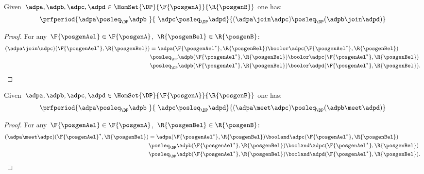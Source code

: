 \begin{lemma}
    \label{lem:coprod_mon}
    Given~$\adpa,\adpb,\adpc,\adpd \in \HomSet{\DP}{\F{\posgenA}}{\R{\posgenB}}$ one has:
    \begin{equation*}
        \prfperiod{\adpa\posleq_\DP \adpb\ }{\ \adpc\posleq_\DP\adpd}{(\adpa\join\adpc)\posleq_\DP (\adpb\join \adpd)}
    \end{equation*}
\end{lemma}
\begin{proof}
    For any~$\F{\posgenAel}\in \F{\posgenA}$,~$\R{\posgenBel}\in \R{\posgenB}$:
    \begin{equation*}
        \begin{aligned}
            (\adpa \join \adpc)(\F{\posgenAel^*},\R{\posgenBel})
             & =\adpa(\F{\posgenAel^*},\R{\posgenBel})\boolor \adpc(\F{\posgenAel^*},\R{\posgenBel})             \\
             & \posleq_\DP \adpb(\F{\posgenAel^*},\R{\posgenBel})\boolor \adpc(\F{\posgenAel^*},\R{\posgenBel})  \\
             & \posleq_\DP \adpb(\F{\posgenAel^*},\R{\posgenBel})\boolor \adpd(\F{\posgenAel^*},\R{\posgenBel}).
        \end{aligned}
    \end{equation*}
\end{proof}

\begin{lemma}
    \label{lem:intersection_mon}
    Given~$\adpa,\adpb,\adpc,\adpd \in \HomSet{\DP}{\F{\posgenA}}{\R{\posgenB}}$ one has:
    \begin{equation*}
        \prfperiod{\adpa\posleq_\DP \adpb\ }{\ \adpc\posleq_\DP \adpd}{(\adpa\meet \adpc)\posleq_\DP (\adpb\meet \adpd)}
    \end{equation*}
\end{lemma}
\begin{proof}
    For any~$\F{\posgenAel}\in \F{\posgenA}$,~$\R{\posgenBel}\in \R{\posgenB}$:
    \begin{equation*}
        \begin{aligned}
            (\adpa \meet \adpc)(\F{\posgenAel}^*,\R{\posgenBel})
             & =\adpa(\F{\posgenAel^*},\R{\posgenBel})\booland \adpc(\F{\posgenAel^*},\R{\posgenBel})             \\
             & \posleq_\DP \adpb(\F{\posgenAel^*},\R{\posgenBel})\booland \adpc(\F{\posgenAel^*},\R{\posgenBel})  \\
             & \posleq_\DP \adpb(\F{\posgenAel^*},\R{\posgenBel})\booland \adpd(\F{\posgenAel^*},\R{\posgenBel}).
        \end{aligned}
    \end{equation*}
\end{proof}